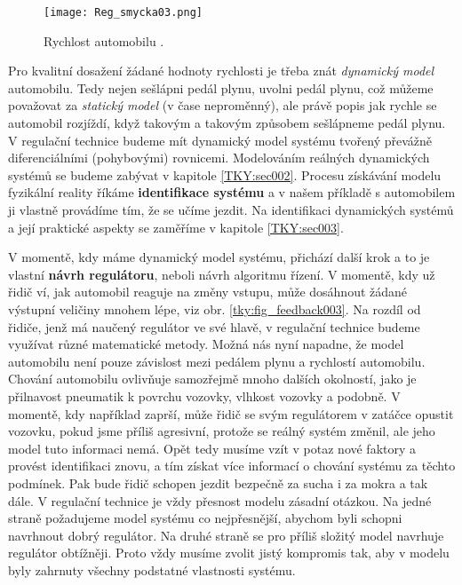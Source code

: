    \begin{figure}[ht!] %
      \centering
      \texttt{[image: Reg\_smycka03.png]}
      \caption{Rychlost automobilu \cite[s.~9]{Roubal2011}.}
      \label{tky:fig_feedback005}
    \end{figure}
    Pro kvalitní dosažení žádané hodnoty rychlosti je třeba znát \emph{dynamický model} automobilu. 
    Tedy nejen sešlápni pedál plynu, uvolni pedál plynu, což můžeme považovat za \emph{statický 
    model} (v čase neproměnný), ale právě popis jak rychle se automobil rozjíždí, když takovým a 
    takovým způsobem sešlápneme pedál plynu. V regulační technice budeme mít dynamický model 
    systému tvořený převážně diferenciálními (pohybovými) rovnicemi. Modelováním reálných 
    dynamických systémů se budeme zabývat v kapitole \ref{TKY:sec002}. Procesu získávání modelu 
    fyzikální reality říkáme \textbf{identifikace systému} a v našem příkladě s automobilem ji 
    vlastně provádíme tím, že se učíme jezdit. Na identifikaci dynamických systémů a její praktické 
    aspekty se zaměříme v kapitole \ref{TKY:sec003}.

    V momentě, kdy máme dynamický model systému, přichází další krok a to je vlastní \textbf{návrh 
    regulátoru}, neboli návrh algoritmu řízení. V momentě, kdy už řidič ví, jak automobil reaguje 
    na změny vstupu, může dosáhnout žádané výstupní veličiny mnohem lépe, viz obr. 
    \ref{tky:fig_feedback003}. Na rozdíl od řidiče, jenž má naučený regulátor ve své hlavě, v 
    regulační technice budeme využívat různé matematické metody. Možná nás nyní napadne, že model 
    automobilu není pouze závislost mezi pedálem plynu a rychlostí automobilu. Chování automobilu 
    ovlivňuje samozřejmě mnoho dalších okolností, jako je přilnavost pneumatik k povrchu vozovky, 
    vlhkost vozovky a podobně. V momentě, kdy například zaprší, může řidič se svým regulátorem v 
    zatáčce opustit vozovku, pokud jsme příliš agresivní, protože se reálný systém změnil, ale jeho 
    model tuto informaci nemá. Opět tedy musíme vzít v potaz nové faktory a provést identifikaci 
    znovu, a tím získat více informací o chování systému za těchto podmínek. Pak bude řidič schopen 
    jezdit bezpečně za sucha i za mokra a tak dále. V regulační technice je vždy přesnost modelu 
    zásadní otázkou. Na jedné straně požadujeme model systému co nejpřesnější, abychom byli schopni 
    navrhnout dobrý regulátor. Na druhé straně se pro příliš složitý model navrhuje regulátor 
    obtížněji. Proto vždy musíme zvolit jistý kompromis tak, aby v modelu byly zahrnuty všechny 
    podstatné vlastnosti systému.

